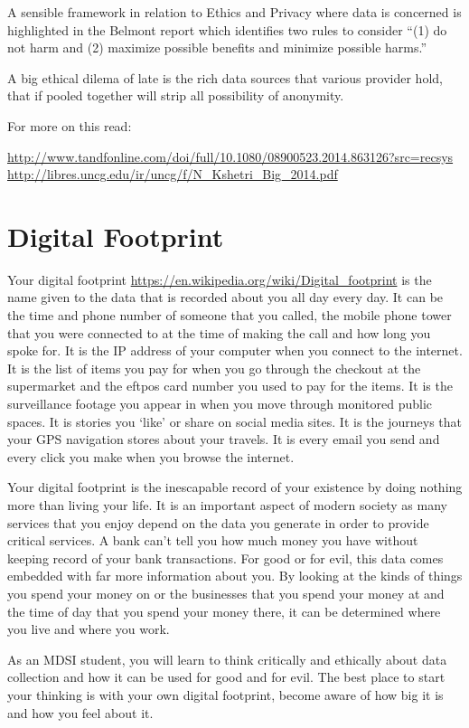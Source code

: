 \documentclass[]{book}
\theoremstyle{definition}
\theoremstyle{definition}
\theoremstyle{remark}
\begin{document}
A sensible framework in relation to Ethics and Privacy where data is
concerned is highlighted in the Belmont report which identifies two
rules to consider ``(1) do not harm and (2) maximize possible benefits
and minimize possible harms.''

A big ethical dilema of late is the rich data sources that various
provider hold, that if pooled together will strip all possibility of
anonymity.

For more on this read:

\url{http://www.tandfonline.com/doi/full/10.1080/08900523.2014.863126?src=recsys}
\url{http://libres.uncg.edu/ir/uncg/f/N_Kshetri_Big_2014.pdf}

\section{Digital Footprint}\label{digital-footprint}

Your digital footprint
\url{https://en.wikipedia.org/wiki/Digital_footprint} is the name given
to the data that is recorded about you all day every day. It can be the
time and phone number of someone that you called, the mobile phone tower
that you were connected to at the time of making the call and how long
you spoke for. It is the IP address of your computer when you connect to
the internet. It is the list of items you pay for when you go through
the checkout at the supermarket and the eftpos card number you used to
pay for the items. It is the surveillance footage you appear in when you
move through monitored public spaces. It is stories you `like' or share
on social media sites. It is the journeys that your GPS navigation
stores about your travels. It is every email you send and every click
you make when you browse the internet.

Your digital footprint is the inescapable record of your existence by
doing nothing more than living your life. It is an important aspect of
modern society as many services that you enjoy depend on the data you
generate in order to provide critical services. A bank can't tell you
how much money you have without keeping record of your bank
transactions. For good or for evil, this data comes embedded with far
more information about you. By looking at the kinds of things you spend
your money on or the businesses that you spend your money at and the
time of day that you spend your money there, it can be determined where
you live and where you work.

As an MDSI student, you will learn to think critically and ethically
about data collection and how it can be used for good and for evil. The
best place to start your thinking is with your own digital footprint,
become aware of how big it is and how you feel about it.
\end{document}
